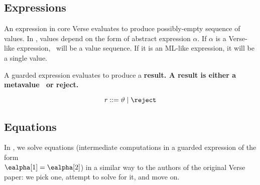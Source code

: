 \documentclass[]{article}
\begin{document}
    \medskip
    

    
    
    
    
    
    

    
    \subsection{Expressions}
    
    \newcommand\GNoTree{\vmrun \rightsquigarrow \uppsidown} An expression in
    core Verse evaluates to produce possibly-empty sequence of values. In
    \Vminus, values depend on the form of abstract expression $\alpha.$ If
    $\alpha$ is a Verse-like expression, \valpha ~will be a value sequence. If
    it is an ML-like expression, it will be a single value. 
    
    A guarded expression evaluates to produce a \bf{result}. A result is either
    a metavalue \valpha ~or reject. 
    
    \[\it{r} \; \rm{::=} \; \vartheta \;|\; \reject \]
    
    
    
    \bigskip
\subsection{Equations}

In \Vminus, we solve equations (intermediate computations in a guarded
expression of the form \\$\ealpha[1] = \ealpha[2]$) in a similar way to the
authors of the original Verse paper: we pick one, attempt to solve for it, and
move on. 
\end{document}

